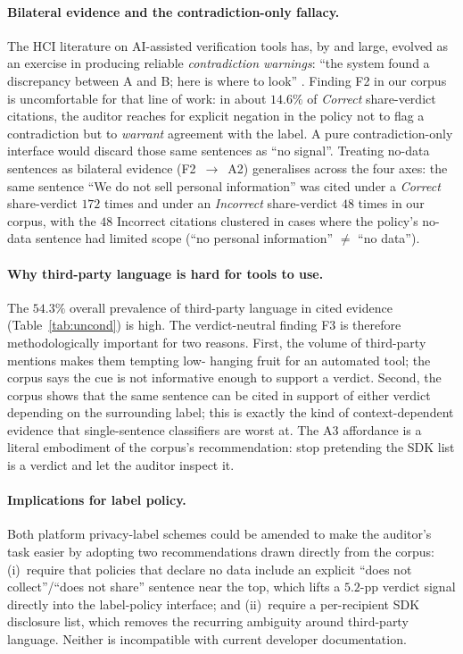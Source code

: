 \documentclass[11pt,a4paper]{article}
\begin{document}
\paragraph{Bilateral evidence and the contradiction-only fallacy.}
The HCI literature on AI-assisted verification tools has, by and
large, evolved as an exercise in producing reliable
\emph{contradiction warnings}: ``the system found a discrepancy
between A and B; here is where to look''
\citep{amershi2019guidelines,bansal2021does,liao2020questioning}.
Finding F2 in our corpus is uncomfortable for that line of work: in
about $14.6\%$ of \emph{Correct} share-verdict citations, the
auditor reaches for explicit negation in the policy not to flag a
contradiction but to \emph{warrant} agreement with the label. A pure
contradiction-only interface would discard those same sentences as
``no signal''. Treating no-data sentences as bilateral evidence
(F2~$\to$~A2) generalises across the four axes: the same sentence
``We do not sell personal information'' was cited under a
\emph{Correct} share-verdict $172$ times and under an
\emph{Incorrect} share-verdict $48$ times in our corpus, with the
$48$ Incorrect citations clustered in cases where the policy's
no-data sentence had limited scope (``no personal information''
$\neq$ ``no data'').

\paragraph{Why third-party language is hard for tools to use.}
The $54.3\%$ overall prevalence of third-party language in cited
evidence (Table~\ref{tab:uncond}) is high. The verdict-neutral
finding F3 is therefore methodologically important for two reasons.
First, the volume of third-party mentions makes them tempting low-
hanging fruit for an automated tool; the corpus says the cue is not
informative enough to support a verdict. Second, the corpus shows
that the same sentence can be cited in support of either verdict
depending on the surrounding label; this is exactly the kind of
context-dependent evidence that single-sentence classifiers are
worst at. The A3 affordance is a literal embodiment of the corpus's
recommendation: stop pretending the SDK list is a verdict and let
the auditor inspect it.

\paragraph{Implications for label policy.}
Both platform privacy-label schemes
\citep{googledatasafety2022,appleprivacylabels2020} could be amended
to make the auditor's task easier by adopting two recommendations
drawn directly from the corpus: (i)~require that policies that declare
no data include an explicit ``does not collect''/``does not share''
sentence near the top, which lifts a $5.2$-pp verdict signal directly
into the label-policy interface; and (ii)~require a per-recipient SDK
disclosure list, which removes the recurring ambiguity around
third-party language. Neither is incompatible with current developer
documentation.
\end{document}
